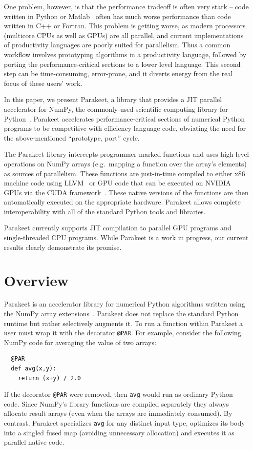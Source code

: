 \documentclass[10pt,twocolumn]{article}
\begin{document}
One problem, however, is that the performance tradeoff is often very stark -- code written in Python or Matlab~\cite{Moler80} often has much worse performance than code written in C++ or Fortran.  This problem is getting worse, as modern processors (multicore CPUs as well as GPUs) are all parallel, and current implementations of productivity languages are poorly suited for parallelism.  Thus a common workflow involves prototyping algorithms in a productivity language, followed by porting the performance-critical sections to a lower level language.  This second step can be time-consuming, error-prone, and it diverts energy from the real focus of these users' work.

In this paper, we present Parakeet, a library that provides a JIT parallel accelerator for NumPy, the commonly-used scientific computing library for Python~\cite{Oliphant07}. Parakeet accelerates performance-critical sections of numerical Python programs to be competitive with efficiency language code, obviating the need for the above-mentioned ``prototype, port'' cycle.

The Parakeet library intercepts programmer-marked functions and uses high-level operations on NumPy arrays (e.g.~mapping a function over the array's elements) as sources of parallelism. These functions are just-in-time compiled to either x86 machine code using LLVM~\cite{Latt02} or GPU code that can be executed on NVIDIA GPUs via the CUDA framework~\cite{NvidCU}. These native versions of the functions are then automatically executed on the appropriate hardware. Parakeet allows complete interoperability with all of the standard Python tools and libraries.

Parakeet currently supports JIT compilation to parallel GPU programs and single-threaded CPU programs.  While Parakeet is a work in progress, our current results clearly demonstrate its promise.  

\section{Overview}
\label{overview}

Parakeet is an accelerator library for numerical Python algorithms written using the NumPy array extensions~\cite{Oliphant07}. Parakeet does not replace the standard Python runtime but rather selectively augments it. To run a function within Parakeet a user must wrap it with the decorator \lstinline{@PAR}. For example, consider the following NumPy code for averaging the value of two arrays: 
\begin{lstlisting}
  @PAR
  def avg(x,y):
    return (x+y) / 2.0
\end{lstlisting}
If the decorator \lstinline{@PAR} were removed, then \lstinline{avg} would run as ordinary Python code. Since NumPy's library functions are compiled separately they always allocate result arrays (even when the arrays are immediately consumed). By contrast, Parakeet specializes \lstinline{avg} for any distinct input type, optimizes its body into a singled fused map (avoiding unnecessary allocation) and executes it as parallel native code.
\end{document}
